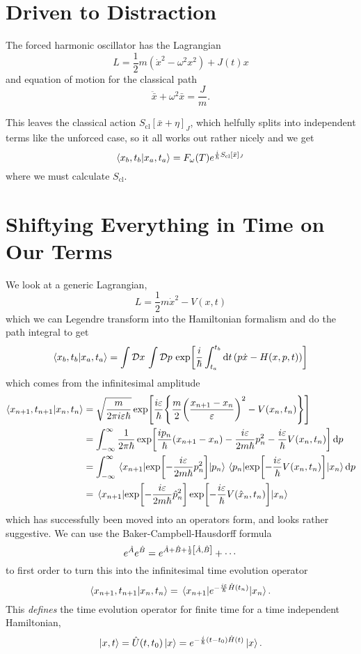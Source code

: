 \documentclass[]{revision-notes}
\begin{document}
\section{Driven to Distraction}
The forced harmonic oscillator has the Lagrangian
\[ L = \frac{1}{2} m (\dot{x}^2 - \omega^2 x^2) + J(t)x \]
and equation of motion for the classical path
\[ \ddot{\bar{x}} + \omega^2 \bar{x} = \frac{J}{m}. \]

This leaves the classical action \(S_\mathrm{cl}[\bar{x} + \eta]_{J} \), which helfully splits into independent terms like the unforced case, so it all works out rather nicely and we get
\begin{equation*}
  \braket{x_b, t_b}{x_a, t_a} = F_\omega(T)e^{\frac{i}{\hbar} S_\mathrm{cl}[\bar{x}]_{J}}
\end{equation*}
where we must calculate \(S_\mathrm{cl}\).

\section{Shiftying Everything in Time on Our Terms}
We look at a generic Lagrangian, \[ L= \frac{1}{2} m \dot{x}^2 - V(x, t) \] which we can Legendre transform into the Hamiltonian formalism and do the path integral to get
\[ \braket{x_b, t_b}{x_a, t_a} = \int \mathcal{D} x\, \int \mathcal{D} p\, \exp[\frac{i}{\hbar} \int_{t_a}^{t_b} \dd{t} (p\dot{x} - H(x, p, t))] \]
which comes from the infinitesimal amplitude
\begin{align*}
  \braket{x_{n+1}, t_{n+1}}{x_n, t_n} &= \sqrt{\frac{m}{2\pi i \varepsilon\hbar}} \exp[\frac{i\varepsilon}{\hbar}\qty{\frac{m}{2}\qty(\frac{x_{n+1} - x_n}{\varepsilon})^2 - V(x_n, t_n)}] \\
  &= \int_{-\infty}^\infty \frac{1}{2\pi\hbar}\exp[\frac{ip_n}{\hbar}(x_{n+1} - x_n) - \frac{i\varepsilon}{2m\hbar}p_n^2 - \frac{i\varepsilon}{\hbar}V(x_n, t_n)]\dd{p}\\
  &= \int_{-\infty}^\infty \mel{x_{n+1}}{\exp[-\frac{i\varepsilon}{2m\hbar}p_n^2]}{p_n} \mel{p_n}{\exp[ -\frac{i\varepsilon}{\hbar}V(x_n, t_n)]}{x_{n}}\dd{p}\\
  &=\mel{x_{n+1}}{\exp[-\frac{i\varepsilon}{2m\hbar}\hat{p}_n^2]\exp[ -\frac{i\varepsilon}{\hbar}V(\hat{x}_n, t_n)]}{x_{n}}
\end{align*}
which has successfully been moved into an operators form, and looks rather suggestive.
We can use the Baker-Campbell-Hausdorff formula \[ e^{\hat{A}}e^{\hat{B}} = e^{\hat{A} + \hat{B} + \frac{1}{2}\commutator{\hat{A}}{\hat{B}}} + \cdots \]
to first order to turn this into the infinitesimal time evolution operator \[\braket{x_{n+1}, t_{n+1}}{x_{n}, t_{n}} = \mel{x_{n+1}}{e^{-\frac{i\varepsilon}{\hbar{}} \hat{H}(t_n)}}{x_{n}}.\]
This \emph{defines} the time evolution operator for finite time for a time independent Hamiltonian,
\[ \ket{x, t} = \hat{U}(t, t_0)\ket{x} = e^{-\frac{i}{\hbar{}} (t - t_0) \hat{H}(t)}\ket{x}.\]
\end{document}
